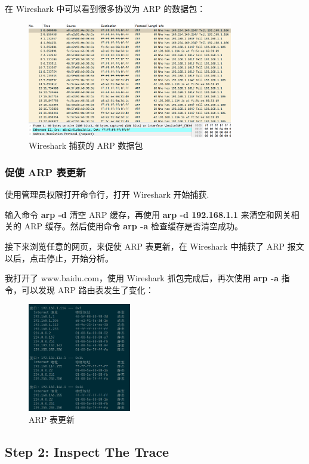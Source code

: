 \documentclass[14pt,a4paper,UTF8,twoside]{article}
\begin{document}
在 Wireshark 中可以看到很多协议为 ARP 的数据包：

\begin{figure} [H]
    \centering
    \includegraphics[width=0.8\textwidth]{lab4/arptable.png}
    \caption{Wireshark 捕获的 ARP 数据包}
\end{figure}

\subsubsection{促使 ARP 表更新}

使用管理员权限打开命令行，打开 Wireshark 开始捕获.

输入命令 \textbf{arp -d } 清空 ARP 缓存，再使用 \textbf{arp -d 192.168.1.1} 来清空和网关相关的 ARP 缓存。然后使用命令 \textbf{arp -a} 检查缓存是否清空成功。

接下来浏览任意的网页，来促使 ARP 表更新，在 Wireshark 中捕获了 ARP 报文以后，点击停止，开始分析。

我打开了 www.baidu.com，使用 Wireshark 抓包完成后，再次使用 \textbf{arp -a} 指令，可以发现 ARP 路由表发生了变化：

\begin{figure}[H]
    \centering
    \includegraphics[width=0.4\textwidth]{lab4/arpupdate.png}
    \caption{ARP 表更新}
\end{figure}

\subsection{Step 2: Inspect The Trace}
\end{document}
